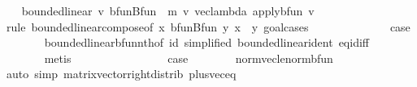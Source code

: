 \begin{isabellebody}
\isanewline
\ \ \isamarkupfalse%
\ {\isachardoublequoteopen}bounded{\isacharunderscore}{\kern0pt}linear\ {\isacharparenleft}{\kern0pt}{\isasymlambda}v{\isachardot}{\kern0pt}\ bfun{\isachardot}{\kern0pt}Bfun\ {\isacharparenleft}{\kern0pt}{\isacharparenleft}{\kern0pt}{\isachardollar}{\kern0pt}{\isacharparenright}{\kern0pt}\ {\isacharparenleft}{\kern0pt}m\ {\isacharasterisk}{\kern0pt}v\ vec{\isacharunderscore}{\kern0pt}lambda\ {\isacharparenleft}{\kern0pt}apply{\isacharunderscore}{\kern0pt}bfun\ v{\isacharparenright}{\kern0pt}{\isacharparenright}{\kern0pt}{\isacharparenright}{\kern0pt}{\isacharparenright}{\kern0pt}{\isachardoublequoteclose}\isanewline
\ \ \isamarkupfalse%
\ {\isacharparenleft}{\kern0pt}rule\ bounded{\isacharunderscore}{\kern0pt}linear{\isacharunderscore}{\kern0pt}compose{\isacharbrackleft}{\kern0pt}of\ {\isachardoublequoteopen}{\isasymlambda}x{\isachardot}{\kern0pt}\ bfun{\isachardot}{\kern0pt}Bfun\ {\isacharparenleft}{\kern0pt}{\isasymlambda}y{\isachardot}{\kern0pt}\ x\ {\isachardollar}{\kern0pt}\ y{\isacharparenright}{\kern0pt}{\isachardoublequoteclose}{\isacharbrackright}{\kern0pt}{\isacharcomma}{\kern0pt}\ goal{\isacharunderscore}{\kern0pt}cases{\isacharparenright}{\kern0pt}\isanewline
\ \ \ \ \isamarkupfalse%
\ {}\isanewline
\ \ \ \ \isamarkupfalse%
\ \isamarkupfalse%
\ {\isacharquery}{\kern0pt}case\isanewline
\ \ \ \ \ \ \isamarkupfalse%
\ bounded{\isacharunderscore}{\kern0pt}linear{\isacharunderscore}{\kern0pt}bfun{\isacharunderscore}{\kern0pt}nth{\isacharbrackleft}{\kern0pt}of\ id{\isacharcomma}{\kern0pt}\ simplified{\isacharbrackright}{\kern0pt}\ bounded{\isacharunderscore}{\kern0pt}linear{\isacharunderscore}{\kern0pt}ident\ eq{\isacharunderscore}{\kern0pt}id{\isacharunderscore}{\kern0pt}iff\ \isanewline
\ \ \ \ \ \ \isamarkupfalse%
\ metis\isanewline
\ \ \isamarkupfalse%
\isanewline
\ \ \ \ \isamarkupfalse%
\ {}\isanewline
\ \ \ \ \isamarkupfalse%
\ \isamarkupfalse%
\ {\isacharquery}{\kern0pt}case\isanewline
\ \ \ \ \ \ \isamarkupfalse%
\ norm{\isacharunderscore}{\kern0pt}vec{\isacharunderscore}{\kern0pt}le{\isacharunderscore}{\kern0pt}norm{\isacharunderscore}{\kern0pt}bfun\isanewline
\ \ \ \ \ \ \isamarkupfalse%
\ {\isacharparenleft}{\kern0pt}auto\ simp{\isacharcolon}{\kern0pt}\ matrix{\isacharunderscore}{\kern0pt}vector{\isacharunderscore}{\kern0pt}right{\isacharunderscore}{\kern0pt}distrib\ plus{\isacharunderscore}{\kern0pt}vec{\isacharunderscore}{\kern0pt}eq\isanewline

\end{isabellebody}
